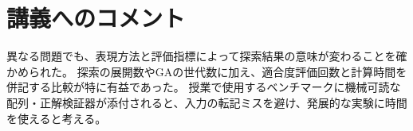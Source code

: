 \documentclass[a4paper,10pt,twocolumn]{article}
\begin{document}
\clearpage
\clearpage
\clearpage
\clearpage
\clearpage
\clearpage
\section*{講義へのコメント}
異なる問題でも、表現方法と評価指標によって探索結果の意味が変わることを確かめられた。
探索の展開数やGAの世代数に加え、適合度評価回数と計算時間を併記する比較が特に有益であった。
授業で使用するベンチマークに機械可読な配列・正解検証器が添付されると、入力の転記ミスを避け、発展的な実験に時間を使えると考える。

\end{document}
